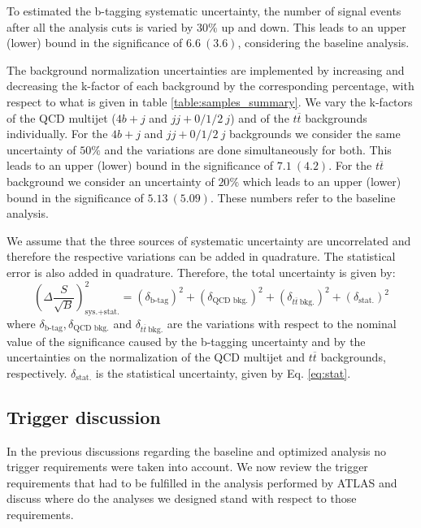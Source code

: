 To estimated the b-tagging systematic uncertainty, the number of signal events after all the analysis cuts is varied by $30\%$ up and down. This leads to an upper (lower) bound in the significance of $6.6~(3.6)$, considering the baseline analysis.

The background normalization uncertainties are implemented by increasing and decreasing the k-factor of each background by the corresponding percentage, with respect to what is given in table \ref{table:samples_summary}. We vary the k-factors of the QCD multijet ($4b+j$ and $jj+0/1/2 ~j$) and of the $t\overline{t}$ backgrounds individually. For the $4b+j$ and $jj+0/1/2 ~j$ backgrounds we consider the same uncertainty of $50\%$ and the variations are done simultaneously for both. This leads to an upper (lower) bound in the significance of $7.1~(4.2)$. For the $t\overline{t}$ background we consider an uncertainty of $20\%$ which leads to an upper (lower) bound in the significance of $5.13~(5.09)$. These numbers refer to the baseline analysis.

We assume that the three sources of systematic uncertainty are uncorrelated and therefore the respective variations can be added in quadrature. The statistical error is also added in quadrature. Therefore, the total uncertainty is given by:
\begin{equation}
	\left(\Delta\frac{S}{\sqrt{B}}\right)_{\text{sys.+stat.}}^2=\left(\delta_{\text{b-tag}}\right)^2+\left(\delta_{\text{QCD bkg.}}\right)^2+\left(\delta_{t\overline{t}~\text{bkg.}}\right)^2+\left(\delta_{\text{stat.}}\right)^2
\end{equation}
where $\delta_{\text{b-tag}},\delta_{\text{QCD bkg.}}$ and $\delta_{t\overline{t}~\text{bkg.}}$ are the variations with respect to the nominal value of the significance caused by the b-tagging uncertainty and by the uncertainties on the normalization of the  QCD multijet and $t\overline{t}$ backgrounds, respectively. $\delta_{\text{stat.}}$ is the statistical uncertainty, given by Eq. \ref{eq:stat}. 

\subsection{Trigger discussion}

In the previous discussions regarding the baseline and optimized analysis no trigger requirements were taken into account. We now review the trigger requirements that had to be fulfilled in the analysis performed by ATLAS and discuss where do the analyses we designed stand with respect to those requirements. 

